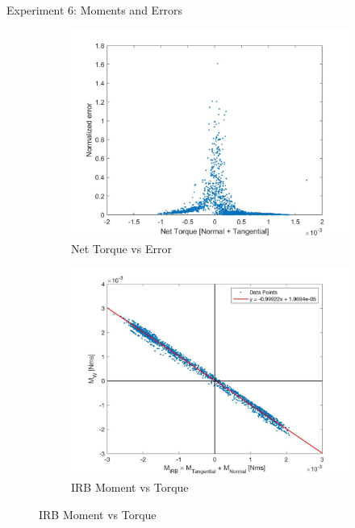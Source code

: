 \begin{frame}{Experiment 6: Moments and Errors}
\begin{figure}
    \centering
    \quad
    \begin{subfigure}[b]{0.4\linewidth}
        \includegraphics[scale=0.105]{figures/IRB Classic Net torque vs error.jpg}
        \caption{Net Torque vs Error}
        \label{fig:AP_angle}
    \end{subfigure}
    \quad
    \begin{subfigure}[b]{0.5\linewidth}
        \includegraphics[scale=0.13]{figures/MomentProp2.jpg}
        \caption{IRB Moment vs Torque}
        \label{fig:MomentIRB}
    \end{subfigure}
\end{figure}    
    
    
\end{frame}

